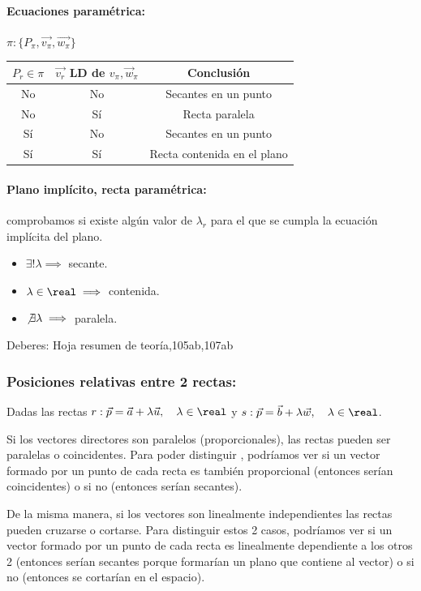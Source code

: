 \paragraph{Ecuaciones paramétrica: } $\pi: \{P_{\pi},\vec{v_{\pi}}, \vec{w_{\pi}}\}$ 

\begin{center}
\begin{tabular}{ccc}
$P_r \in \pi $ & $\vec{v_r}$ LD de $v_{\pi}, \vec{w}_{\pi}$ & \textbf{Conclusión}\\\hline
No & No & Secantes en un punto\\
No & Sí & Recta paralela\\
Sí & No & Secantes en un punto\\
Sí & Sí & Recta contenida en el plano\\
\end{tabular}
\end{center}

\paragraph{Plano implícito, recta paramétrica: } comprobamos si existe algún valor de $\lambda_{r}$ para el que se cumpla la ecuación implícita del plano. 
\begin{itemize}
  \item $\exists!\lambda \implies $ secante.
  \item $\lambda \in \real \implies$ contenida.
  \item $\not\exists \lambda \implies $ paralela.
\end{itemize}

Deberes: Hoja resumen de teoría,105ab,107ab

\subsubsection{Posiciones relativas entre 2 rectas:}

Dadas las rectas 
$r:\vec{p} = \vec{a} + \lambda\vec{u},\quad \lambda\in\real$
y
$s:\vec{p} = \vec{b} + \lambda\vec{w},\quad \lambda\in\real$. 

Si los vectores directores son paralelos (proporcionales), las rectas pueden ser paralelas o coincidentes. 
%
Para poder distinguir , podríamos ver si un vector formado por un punto de cada recta es también proporcional (entonces serían coincidentes) o si no (entonces serían secantes).

De la misma manera, si los vectores son linealmente independientes las rectas pueden cruzarse o cortarse. 
%
Para distinguir estos 2 casos, podríamos ver si un vector formado por un punto de cada recta es linealmente dependiente a los otros 2 (entonces serían secantes porque formarían un plano que contiene al vector) o si no (entonces se cortarían en el espacio).

